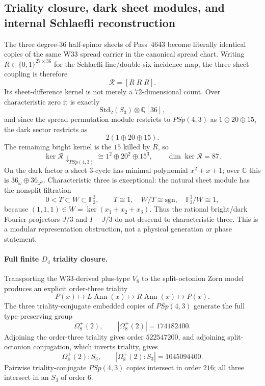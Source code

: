 \subsection{Triality closure, dark sheet modules, and internal Schlaefli reconstruction}
\label{subsec:pass4648-4655}

The three degree-$36$ half-spinor sheets of Pass~4643 become literally identical
copies of the same W33 spread carrier in the canonical spread chart.  Writing
$R\in\{0,1\}^{27\times36}$ for the Schlaefli-line/double-six incidence map, the
three-sheet coupling is therefore
\[
  \mathcal R=[R\;R\;R].
\]
Its sheet-difference kernel is not merely a $72$-dimensional count.  Over
characteristic zero it is exactly
\[
  \mathrm{Std}_2(S_3)\otimes \mathbb Q[36],
\]
and since the spread permutation module restricts to $PSp(4,3)$ as
$1\oplus20\oplus15$, the dark sector restricts as
\[
  2(1\oplus20\oplus15).
\]
The remaining bright kernel is the $15$ killed by $R$, so
\[
  \ker\mathcal R\downarrow_{PSp(4,3)}
  \cong 1^2\oplus20^2\oplus15^3,
  \qquad \dim\ker\mathcal R=87.
\]
On the dark factor a sheet $3$-cycle has minimal polynomial $x^2+x+1$; over
$\mathbb C$ this is $36_\omega\oplus36_{\omega^2}$.  Characteristic three is
exceptional: the natural sheet module has the nonsplit filtration
\[
  0<T\subset W\subset \mathbb F_3^3,
  \qquad T\cong1,\quad W/T\cong\mathrm{sgn},\quad \mathbb F_3^3/W\cong1,
\]
because $(1,1,1)\in W=\ker(x_1+x_2+x_3)$.  Thus the rational bright/dark
Fourier projectors $J/3$ and $I-J/3$ do not descend to characteristic three.
This is a modular representation obstruction, not a physical generation or
phase statement.

\paragraph{Full finite $D_4$ triality closure.}
Transporting the W33-derived plus-type $V_8$ to the split-octonion Zorn model
produces an explicit order-three triality
\[
  P(x)\longmapsto L\!\operatorname{Ann}(x)
  \longmapsto R\!\operatorname{Ann}(x)
  \longmapsto P(x).
\]
The three triality-conjugate embedded copies of $PSp(4,3)$ generate the
full type-preserving group
\[
  \Omega_8^+(2),\qquad |\Omega_8^+(2)|=174182400.
\]
Adjoining the order-three triality gives order $522547200$, and adjoining
split-octonion conjugation, which inverts triality, gives
\[
  \Omega_8^+(2):S_3,\qquad |\Omega_8^+(2):S_3|=1045094400.
\]
Pairwise triality-conjugate $PSp(4,3)$ copies intersect in order $216$; all
three intersect in an $S_3$ of order $6$.

